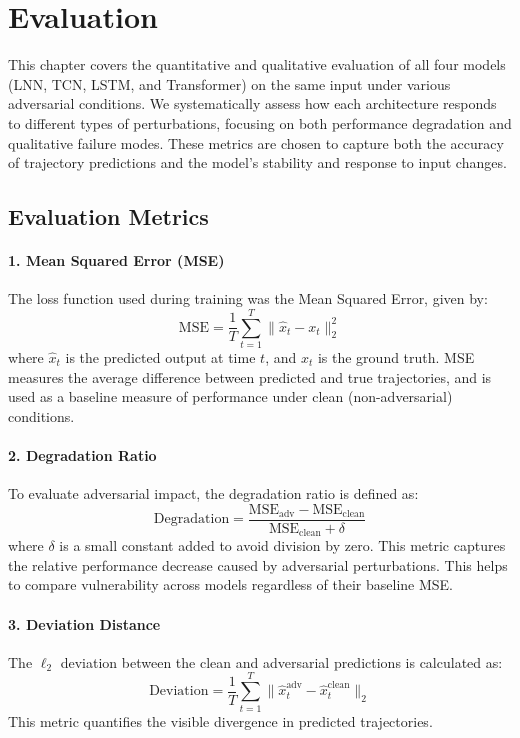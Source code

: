 \chapter{Evaluation}
\label{chap:evaluation}
This chapter covers the quantitative and qualitative evaluation of all four models (LNN, TCN, LSTM, and Transformer) on the same input under various adversarial conditions. We systematically assess how each architecture responds to different types of perturbations, focusing on both performance degradation and qualitative failure modes. These metrics are chosen to capture both the accuracy of trajectory predictions and the model's stability and response to input changes.

\section{Evaluation Metrics}

\subsubsection*{1. Mean Squared Error (MSE)}
The loss function used during training was the Mean Squared Error, given by:
\[
\text{MSE} = \frac{1}{T} \sum_{t=1}^{T} \| \hat{x}_t - x_t \|_2^2
\]
where $\hat{x}_t$ is the predicted output at time $t$, and $x_t$ is the ground truth. MSE measures the average difference between predicted and true trajectories, and is used as a baseline measure of performance under clean (non-adversarial) conditions.

\subsubsection*{2. Degradation Ratio}
To evaluate adversarial impact, the degradation ratio is defined as:
\[
\text{Degradation} = \frac{\text{MSE}_{\text{adv}} - \text{MSE}_{\text{clean}}}{\text{MSE}_{\text{clean}} + \delta}
\]
where $\delta$ is a small constant added to avoid division by zero. This metric captures the relative performance decrease caused by adversarial perturbations. This helps to compare vulnerability across models regardless of their baseline MSE.

\subsubsection*{3. Deviation Distance}
The $\ell_2$ deviation between the clean and adversarial predictions is calculated as:
\[
\text{Deviation} = \frac{1}{T} \sum_{t=1}^{T} \| \hat{x}_t^{\text{adv}} - \hat{x}_t^{\text{clean}} \|_2
\]
This metric quantifies the visible divergence in predicted trajectories.

